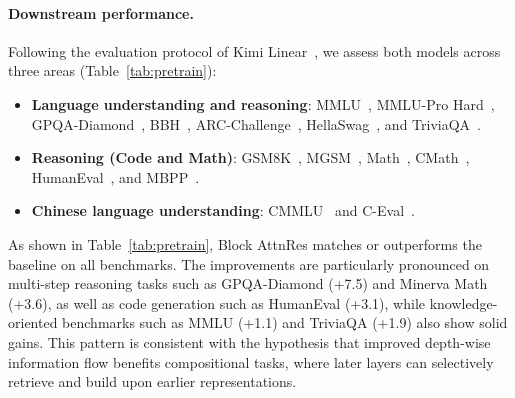 \paragraph{Downstream performance.}
Following the evaluation protocol of Kimi Linear~\cite{zhang2025kimi}, we assess both models across three areas (Table~\ref{tab:pretrain}):
\begin{itemize}[leftmargin=*]
    \item \textbf{Language understanding and reasoning}: MMLU~\cite{hendrycks-2021-mmlu}, MMLU-Pro Hard~\cite{wang2024mmlu}, GPQA-Diamond~\cite{rein2024gpqa}, BBH~\cite{suzgun2022challenging}, ARC-Challenge~\cite{clark-2018-arc}, HellaSwag~\cite{zellers-2019-hellaswag}, and TriviaQA~\cite{joshi2017triviaqa}.
    \item \textbf{Reasoning (Code and Math)}: GSM8K~\cite{gsm8k}, MGSM~\cite{mgsm}, Math~\cite{minervamath}, CMath~\cite{cmathbmk}, HumanEval~\cite{chen2021evaluatinglargelanguagemodels}, and MBPP~\cite{austin2021programsynthesislargelanguage}.
    \item \textbf{Chinese language understanding}: CMMLU~\cite{li-etal-2024-cmmlu} and C-Eval~\cite{huang2023c}.
\end{itemize}
As shown in Table~\ref{tab:pretrain}, Block AttnRes matches or outperforms the baseline on all benchmarks. The improvements are particularly pronounced on multi-step reasoning tasks such as GPQA-Diamond (+7.5) and Minerva Math (+3.6), as well as code generation such as HumanEval (+3.1), while knowledge-oriented benchmarks such as MMLU (+1.1) and TriviaQA (+1.9) also show solid gains. This pattern is consistent with the hypothesis that improved depth-wise information flow benefits compositional tasks, where later layers can selectively retrieve and build upon earlier representations.


